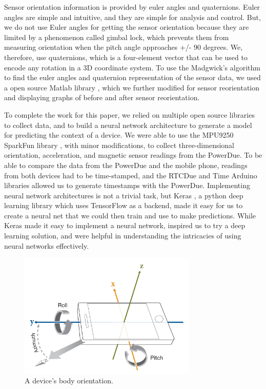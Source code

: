 \documentclass[journal]{IEEEtranTIE}
\begin{document}
Sensor orientation information is provided by euler angles and quaternions.
Euler angles are simple and intuitive, and they are simple for analysis and
control. But, we do not use Euler angles for getting the sensor orientation
because they are limited by a phenomenon called gimbal lock, which prevents them
from measuring orientation when the pitch angle approaches +/- 90 degrees. We,
therefore, use quaternions, which is a four-element vector that can be used to
encode any rotation in a 3D coordinate system. To use the Madgwick's algorithm
to find the euler angles and quaternion representation of the sensor data, we
used a open source Matlab library \cite{MadgwickCode}, which we further modified
for sensor reorientation and displaying graphs of before and after sensor
reorientation.

To complete the work for this paper, we relied on multiple open source libraries
to collect data, and to build a neural network architecture to generate a model
for predicting the context of a device. We were able to use the MPU9250 SparkFun
library \cite{MPU9250}, with minor modifications, to collect three-dimensional
orientation, acceleration, and magnetic sensor readings from the PowerDue. To be
able to compare the data from the PowerDue and the mobile phone, readings from
both devices had to be time-stamped, and the RTCDue \cite{RTCDue} and Time
\cite{TimeLib} Arduino libraries allowed us to generate timestamps with the
PowerDue. Implementing neural network architectures is not a trivial task, but
Keras \cite{Keras}, a python deep learning library which uses TensorFlow as a
backend, made it easy for us to create a neural net that we could then train and
use to make predictions. While Keras made it easy to implement a neural network,
\cite{LeCunn,DeepLearning} inspired us to try a deep learning solution, and
\cite{DeepLearning,Dropout} were helpful in understanding the intricacies of
using neural networks effectively.


\begin{figure}[!t]\centering
	\includegraphics[width=8.5cm]{phoneOrientation}
	\caption{A device's body orientation.}\label{fig:fig1}
\end{figure}
\end{document}
